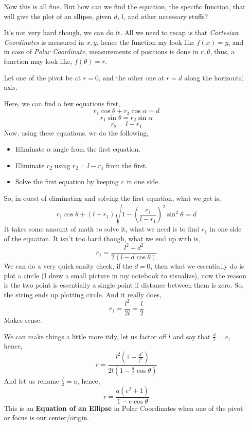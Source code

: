 \documentclass[11pt,a4paper]{article}
\newcommand{\incfig}[1]{%
    \def\svgwidth{0.7\columnwidth}
    {#1.pdf_tex}
}
\begin{document}
Now this is all fine. But how can we find the equation, the specific function, that will give the plot of an ellipse, given $d$, $l$, and other necessary stuffs? 

It's not very hard though, we can do it. All we need to recap is that \emph{Cartesian Coordinates} is measured in $x,y$, hence the function my look like $f(x) = y$, and in case of \emph{Polar Coordinate}, measurements of positions is done in $r,\theta$, thus, a function may look like, $f( \theta) = r$.





Let one of the pivot be at $r= 0$, and the other one at $r= d$ along the horizontal axis. 




Here, we can find a few equations first,
\[ 
r_1 \cos \theta + r_2 \cos \alpha = d
\]
\[ 
r_1 \sin \theta = r_2 \sin \alpha
\]
\[ 
r_2 = l - r_1
\]
Now, using these equations, we do the following,
\begin{itemize}
    \item Eliminate $\alpha$ angle from the first equation. 
    \item Eliminate $r_2$ using $r_2 = l - r_1$ from the first. 
    \item Solve the first equation by keeping $r$ in one side.    
\end{itemize}
So, in quest of eliminating and solving the first equation, what we get is,
\[ 
    r_1 \cos \theta + \left( l-r_1 \right) \sqrt{1 - \left( \frac{r_1}{l- r_1} \right) ^2 \sin^2\theta} = d
\]  
It takes some amount of math to solve it, what we need is to find $r_1$ in one side of the equation. It isn't too hard though, what we end up with is,
\[ 
    r_1 = \frac{l^2 + d^2}{2 \left( l- d \cos \theta \right) }
\]
We can do a very quick sanity check, if the $d=0$, then what we essentially do is plot a circle (I drew a small picture in my notebook to visualize), now the reason is the two point is essentially a single point if distance between them is zero. So, the string ends up plotting circle. And it really does,\[ 
r_1 = \frac{l^2}{2 l } = \frac{l}{2}
\] Makes sense.

We can make things a little more tidy, let us factor off $l$ and say that $\frac{d}{l} = e$, 
hence,
\[ 
    r = \frac{l^2 \left(  1 + \frac{d^2}{l^2} \right) }{2l \left( 1-\frac{d}{l}\cos\theta  \right) }
\] 
And let us rename $\frac{l}{2 } = a$, hence,
\[
    \boxed{ r = \frac{a \left( e^2 + 1 \right) }{1 - e \cos \theta} }
\]
This is an \textbf{Equation of an Ellipse} in Polar Coordinates when one of the pivot or focus is our center/origin.
\end{document}
